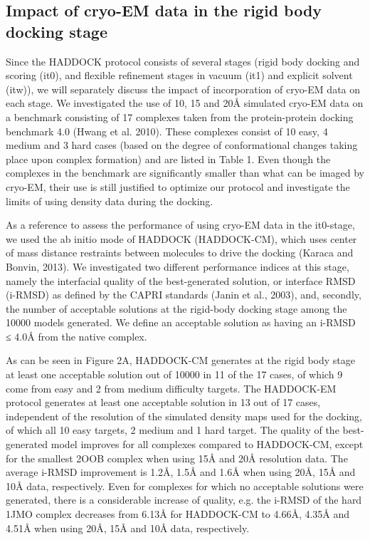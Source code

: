 \subsection{Impact of cryo-EM data in the rigid body docking stage}

Since the HADDOCK protocol consists of several stages (rigid body docking and scoring (it0), and flexible refinement stages in vacuum (it1) and explicit solvent (itw)), we will separately discuss the impact of incorporation of cryo-EM data on each stage. 
We investigated the use of 10, 15 and 20Å simulated cryo-EM data on a benchmark consisting of 17 complexes taken from the protein-protein docking benchmark 4.0 (Hwang et al. 2010). 
These complexes consist of 10 easy, 4 medium and 3 hard cases (based on the degree of conformational changes taking place upon complex formation) and are listed in Table 1. 
Even though the complexes in the benchmark are significantly smaller than what can be imaged by cryo-EM, their use is still justified to optimize our protocol and investigate the limits of using density data during the docking.

As a reference to assess the performance of using cryo-EM data in the it0-stage, we used the ab initio mode of HADDOCK (HADDOCK-CM), which uses center of mass distance restraints between molecules to drive the docking (Karaca and Bonvin, 2013). 
We investigated two different performance indices at this stage, namely the interfacial quality of the best-generated solution, or interface RMSD (i-RMSD) as defined by the CAPRI standards (Janin et al., 2003), and, secondly, the number of acceptable solutions at the rigid-body docking stage among the 10000 models generated. We define an acceptable solution as having an i-RMSD ≤ 4.0Å from the native complex.

As can be seen in Figure 2A, HADDOCK-CM generates at the rigid body stage at least one acceptable solution out of 10000 in 11 of the 17 cases, of which 9 come from easy and 2 from medium difficulty targets. 
The HADDOCK-EM protocol generates at least one acceptable solution in 13 out of 17 cases, independent of the resolution of the simulated density maps used for the docking, of which all 10 easy targets, 2 medium and 1 hard target. 
The quality of the best-generated model improves for all complexes compared to HADDOCK-CM, except for the smallest 2OOB complex when using 15Å and 20Å resolution data. 
The average i-RMSD improvement is 1.2Å, 1.5Å and 1.6Å when using 20Å, 15Å and 10Å data, respectively. 
Even for complexes for which no acceptable solutions were generated, there is a considerable increase of quality, e.g. the i-RMSD of the hard 1JMO complex decreases from 6.13Å for HADDOCK-CM to 4.66Å, 4.35Å and 4.51Å when using 20Å, 15Å and 10Å data, respectively. 

